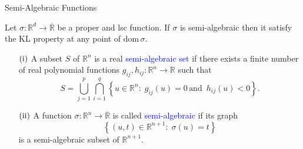 \documentclass[9pt,handout]{beamer} %
\newcommand{\s}{\sigma}
\newcommand{\rr}{\mathbb{R}} %
\newcommand{\dom}[1]{\mathrm{dom}\,{#1}} %
\begin{document}
	\begin{frame}{Semi-Algebraic Functions}
        \begin{theorem}
            Let $\s : \rr^{d} \rightarrow \overline{\rr}$ be a proper and lsc function. If 
            $\s$ is semi-algebraic then it satisfy the KL property at any point of 
            $\dom{\s}$.
        \end{theorem}
		\vspace{0.3in}
		\pause
        \begin{definition}
            \begin{itemize}
                \item[$\rm{(i)}$] A subset $S$ of $\rr^{n}$ is a real \textcolor{blue}{semi-algebraic set} if there exists a finite number of real polynomial functions $g_{ij} , h_{ij} : \rr^{n} \rightarrow \rr$ such that
                    \begin{equation*}
                        S = \bigcup_{j = 1}^{p} \bigcap_{i = 1}^{q} \left\{ u \in \rr^{n} : 
                        \; g_{ij}\left(u\right) = 0 \, \text{and } \, h_{ij}\left(u\right) < 
                        0 \right\}.
                    \end{equation*}
                \item[$\rm{(ii)}$] A function $\s : \rr^{n} \rightarrow \overline{\rr}$ is 
                	called \textcolor{blue}{semi-algebraic} if its graph
                    \begin{equation*}
                        \left\{ \left(u , t\right) \in \rr^{n + 1} : \; \s\left(u\right) = t 
                        \right\}
                    \end{equation*}
                    is a semi-algebraic subset of $\rr^{n + 1}$.
            \end{itemize}
        \end{definition}
    \end{frame}
\end{document}
